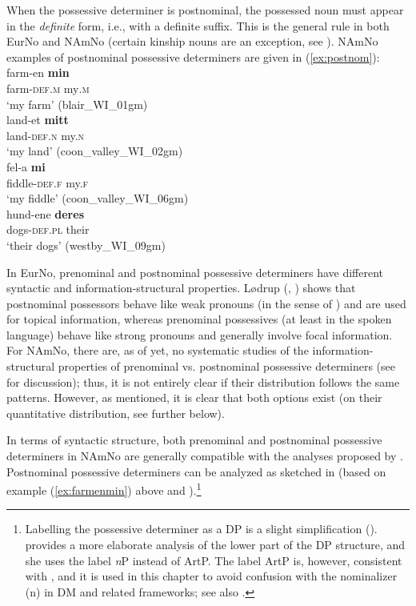 \documentclass[output=paper,colorlinks,citecolor=brown]{langscibook}
\begin{document}
When the possessive determiner is postnominal, the possessed noun must appear in the \emph{definite} form, i.e., with a definite suffix.  This is the general rule in both EurNo and NAmNo (certain kinship nouns are an exception, see ). NAmNo examples of postnominal possessive determiners are given in (\ref{ex:postnom}):
\ea \label{ex:postnom}
\ea \label{ex:farmenmin} \gll farm-en \textbf{min} \\
farm-\textsc{def.m} my\textsc{.m}\\
\glt `my farm' (blair\_WI\_01gm)\\
\ex \label{landetmitt} \gll land-et \textbf{mitt} \\
land-\textsc{def.n} my.\textsc{n} \\
\glt `my land' (coon\_valley\_WI\_02gm) \\
\ex \gll fel-a \textbf{mi} \\
fiddle-\textsc{def.f} my.\textsc{f} \\
\glt `my fiddle' (coon\_valley\_WI\_06gm)\\
\ex hund-ene \textbf{deres}\\
dogs-\textsc{def.pl} their\\
\glt `their dogs' (westby\_WI\_09gm)\\
\z 
\z 



\noindent In EurNo, prenominal and postnominal possessive determiners have different syntactic and information\hyp structural properties. Lødrup (\citeyear{lødrup2011norwegian}, \citeyear{lødrup2012forholdet}) shows that postnominal possessors behave like weak pronouns (in the sense of \citealt{cardinaletteistarke1999typology}) and are used for topical information, whereas prenominal possessives (at least in the spoken language) behave like strong pronouns and generally involve focal information. For NAmNo, there are, as of yet, no systematic studies of the information-structural properties of prenominal vs. postnominal possessive determiners (see \citealt[327]{anderssenwestergaard2012tospraklighet} for discussion); thus, it is not entirely clear if their distribution follows  the same 
patterns. However, as mentioned, it is clear that both options exist (on their quantitative distribution, see further below). 

In terms of syntactic structure, both prenominal and postnominal possessive determiners in NAmNo are generally compatible with the analyses proposed by \citet{julien2005nominals}. Postnominal possessive determiners can be analyzed as sketched in  (based on example (\ref{ex:farmenmin}) above and \citealt[163]{julien2005nominals}).\footnote{Labelling the possessive determiner as a DP is a slight simplification (\citealt[162]{Julien2005}). \citet{julien2005nominals} provides a more elaborate analysis of the lower part of the DP structure, and she uses the label \emph{n}P instead of ArtP. The label ArtP is, however, consistent with \citet{julien2002determiners}, and it is used in this chapter to avoid confusion with the nominalizer (n) in DM and related frameworks; see also .}
\end{document}

